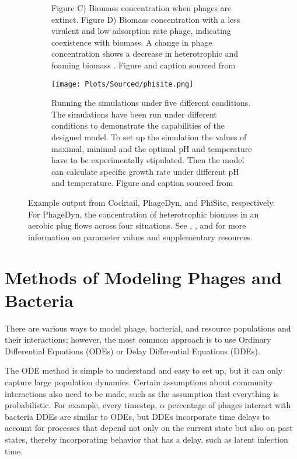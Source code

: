 \begin{figure}
\begin{subfigure}{0.32\linewidth}
{            Figure C) Biomass concentration when phages are extinct. 
            Figure D) Biomass concentration with a less virulent and low adsorption rate phage, indicating coexistence with biomass. 
            A change in phage concentration shows a decrease in heterotrophic and foaming biomass \cite{krysiak-baltynSimulationPhageDynamics2017}. 
            Figure and caption sourced from \cite{krysiak-baltynSimulationPhageDynamics2017}
        }
        \label{fig:sourced:phagedyn_plot}
    \end{subfigure}
    \hfill
    \begin{subfigure}{0.32\linewidth}
        \centering
        \captionsetup{width=1\linewidth}
        \texttt{[image: Plots/Sourced/phisite.png]}
        \caption{
            Running the simulations under five different conditions.
            The simulations have been run under different conditions to demonstrate the capabilities of the designed model. To set up the simulation the values of maximal, minimal and the optimal pH and temperature have to be experimentally stipulated. 
            Then the model can calculate specific growth rate under different pH and temperature. 
            Figure and caption sourced from \citet{bekeModellingInteractionBacteriophages2016}
        }
        \label{fig:sourced:phisite_plot}
    \end{subfigure}
    \caption{
        Example output from Cocktail, PhageDyn, and PhiSite, respectively. 
        For PhageDyn, the concentration of heterotrophic biomass in an aerobic plug flows across four situations.
        See \citet{nilssonCocktailComputerProgram2022}, \citet{krysiak-baltynSimulationPhageDynamics2017}, and \citet{bekeModellingInteractionBacteriophages2016} for more information on parameter values and supplementary resources. 
    }
    \label{fig:sourced:cocktail_and_phagedyn}
\end{figure}

\section{Methods of Modeling Phages and Bacteria}
There are various ways to model phage, bacterial, and resource populations and their interactions; however, the most common approach is to use Ordinary Differential Equations (ODEs) or Delay Differential Equations (DDEs). 

The ODE method is simple to understand and easy to set up, but it can only capture large population dynamics.
Certain assumptions about community interactions also need to be made, such as the assumption that everything is probabilistic.
For example, every timestep, $\alpha$ percentage of phages interact with  bacteria
DDEs are similar to ODEs, but DDEs incorporate time delays to account for processes that depend not only on the current state but also on past states, thereby incorporating behavior that has a delay, such as latent infection time. 

